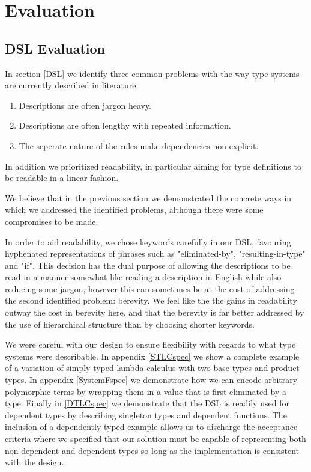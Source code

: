\chapter{Evaluation}

\section{DSL Evaluation}
\label{chapter-DSL-eval}

In section \ref{DSL} we identify three common problems with the way type
systems are currently described in literature.

\begin{enumerate}
\item Descriptions are often jargon heavy.
\item Descriptions are often lengthy with repeated information.
\item The seperate nature of the rules make dependencies non-explicit.
\end{enumerate}

In addition we prioritized readability, in particular aiming for type
definitions to be readable in a linear fashion.

We believe that in the previous section we demonstrated the concrete
ways in which we addressed the identified problems, although there
were some compromises to be made.

In order to aid readability, we chose keywords carefully in our
DSL, favouring hyphenated representations of phrases such as
"eliminated-by", "resulting-in-type" and "if". This decision has the dual
purpose of allowing the descriptions to be read in a manner somewhat
like reading a description in English while also reducing some jargon,
however this can sometimes be at the cost of addressing the second
identified problem: berevity. We feel like the the gains in
readability outway the cost in berevity here, and that the berevity is
far better addressed by the use of hierarchical structure than by
choosing shorter keywords. 

We were careful with our design to ensure flexibility with regards to
what type systems were describable. In appendix \ref{STLCspec} we show
a complete example of a variation of simply typed lambda calculus with
two base types and product types. In appendix \ref{SystemFspec} we
demonstrate how we can encode arbitrary polymorphic terms by wrapping
them in a value that is first eliminated by a type. Finally in
\ref{DTLCspec} we demonstrate that the DSL is readily used for
dependent types by describing singleton types and dependent
functions. The inclusion of a dependently typed example allows us to
discharge the acceptance criteria where we specified that our solution
must be capable of representing both non-dependent and dependent types
so long as the implementation is consistent with the design.

